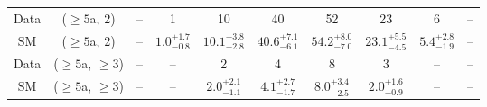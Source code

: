 \begin{table}[h!]
{\begin{tabular}{cccccccccc}
	Data & ($\ge5$a, 2) & -- & 1 & 10 & 40 & 52 & 23 & 6 & -- \\[0.5ex] 
	SM & ($\ge5$a, 2) & -- & $1.0^{+ 1.7 }_{- 0.8 }$ & $10.1^{+ 3.8 }_{- 2.8 }$ & $40.6^{+ 7.1 }_{- 6.1 }$ & $54.2^{+ 8.0 }_{- 7.0 }$ & $23.1^{+ 5.5 }_{- 4.5 }$ & $5.4^{+ 2.8 }_{- 1.9 }$ & -- \\[0.5ex] 
	Data & ($\ge5$a, $\ge3$) & -- & -- & 2 & 4 & 8 & 3 & -- & -- \\[0.5ex] 
	SM & ($\ge5$a, $\ge3$) & -- & -- & $2.0^{+ 2.1 }_{- 1.1 }$ & $4.1^{+ 2.7 }_{- 1.7 }$ & $8.0^{+ 3.4 }_{- 2.5 }$ & $2.0^{+ 1.6 }_{- 0.9 }$ & -- & -- \\[0.5ex] 
	\hline
	\hline
\end{tabular}}
\end{table}
